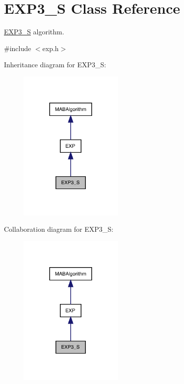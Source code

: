 \hypertarget{class_e_x_p3___s}{}\section{E\+X\+P3\+\_\+S Class Reference}
\label{class_e_x_p3___s}


\mbox{\hyperlink{class_e_x_p3___s}{E\+X\+P3\+\_\+S}} algorithm.  




{\ttfamily \#include $<$exp.\+h$>$}



Inheritance diagram for E\+X\+P3\+\_\+S\+:
\nopagebreak
\begin{figure}[H]
\begin{center}
\leavevmode
\includegraphics[width=144pt]{class_e_x_p3___s__inherit__graph}
\end{center}
\end{figure}


Collaboration diagram for E\+X\+P3\+\_\+S\+:
\nopagebreak
\begin{figure}[H]
\begin{center}
\leavevmode
\includegraphics[width=144pt]{class_e_x_p3___s__coll__graph}
\end{center}
\end{figure}
